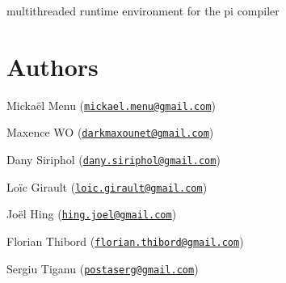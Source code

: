 multithreaded runtime environment for the pi compiler

\section*{Authors}


\begin{DoxyItemize}
\item Mickaël Menu (\href{mailto:mickael.menu@gmail.com}{\tt mickael.\-menu@gmail.\-com})
\item Maxence W\-O (\href{mailto:darkmaxounet@gmail.com}{\tt darkmaxounet@gmail.\-com})
\item Dany Siriphol (\href{mailto:dany.siriphol@gmail.com}{\tt dany.\-siriphol@gmail.\-com})
\item Loïc Girault (\href{mailto:loic.girault@gmail.com}{\tt loic.\-girault@gmail.\-com})
\item Joël Hing (\href{mailto:hing.joel@gmail.com}{\tt hing.\-joel@gmail.\-com})
\item Florian Thibord (\href{mailto:florian.thibord@gmail.com}{\tt florian.\-thibord@gmail.\-com})
\item Sergiu Tiganu (\href{mailto:postaserg@gmail.com}{\tt postaserg@gmail.\-com}) 
\end{DoxyItemize}